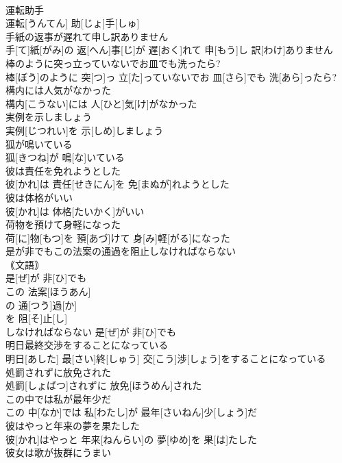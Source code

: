 \documentclass[8pt]{extreport}
\begin{document}
\begin{CJK}{UTF8}{min}
\\	運転助手	
\\	運転[うんてん] 助[じょ]手[しゅ]
\\	手紙の返事が遅れて申し訳ありません	
\\	手[て]紙[がみ]の 返[へん]事[じ]が 遅[おく]れて 申[もう]し 訳[わけ]ありません
\\	棒のように突っ立っていないでお皿でも洗ったら?	
\\	棒[ぼう]のように 突[つ]っ 立[た]っていないでお 皿[さら]でも 洗[あら]ったら?
\\	構内には人気がなかった	
\\	構内[こうない]には 人[ひと]気[け]がなかった
\\	実例を示しましょう	
\\	実例[じつれい]を 示[しめ]しましょう
\\	狐が鳴いている	
\\	狐[きつね]が 鳴[な]いている
\\	彼は責任を免れようとした	
\\	彼[かれ]は 責任[せきにん]を 免[まぬが]れようとした
\\	彼は体格がいい	
\\	彼[かれ]は 体格[たいかく]がいい
\\	荷物を預けて身軽になった	
\\	荷[に]物[もつ]を 預[あづ]けて 身[み]軽[がる]になった
\\	是が非でもこの法案の通過を阻止しなければならない	
\\	｟文語｠
\\	是[ぜ]が 非[ひ]でも 
\\	この 法案[ほうあん]
\\	の 通[つう]過[か]
\\	を 阻[そ]止[し]
\\	しなければならない 是[ぜ]が 非[ひ]でも 
\\	明日最終交渉をすることになっている	
\\	明日[あした] 最[さい]終[しゅう] 交[こう]渉[しょう]をすることになっている
\\	処罰されずに放免された	
\\	処罰[しょばつ]されずに 放免[ほうめん]された
\\	この中では私が最年少だ	
\\	この 中[なか]では 私[わたし]が 最年[さいねん]少[しょう]だ
\\	彼はやっと年来の夢を果たした	
\\	彼[かれ]はやっと 年来[ねんらい]の 夢[ゆめ]を 果[は]たした
\\	彼女は歌が抜群にうまい	

\end{CJK}
\end{document}
